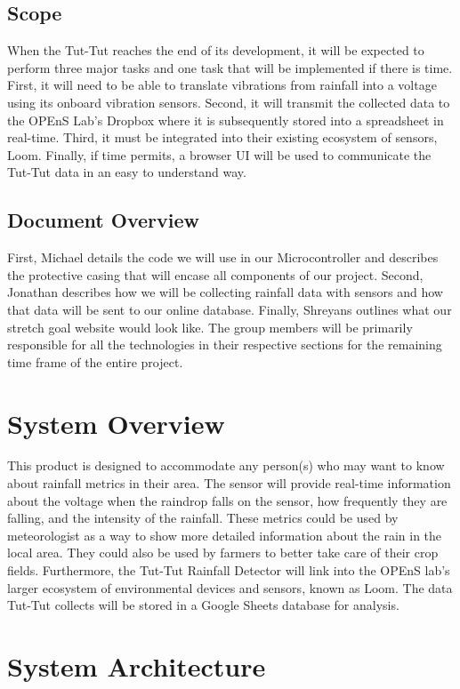 \documentclass[letterpaper,10pt,draftclsnofoot,onecolumn]{article}
\begin{document}
\subsection{Scope}
When the Tut-Tut reaches the end of its development, it will be expected to perform three major tasks and one task that will be implemented if there is time. First, it will need to be able to translate vibrations from rainfall into a voltage using its onboard vibration sensors. Second, it will transmit the collected data to the OPEnS Lab's Dropbox where it is subsequently stored into a spreadsheet in real-time. Third, it must be integrated into their existing ecosystem of sensors, Loom. Finally, if time permits, a browser UI will be used to communicate the Tut-Tut data in an easy to understand way.

\subsection{Document Overview}
First, Michael details the code we will use in our Microcontroller and describes the protective casing that will encase all components of our project. Second, Jonathan describes how we will be collecting rainfall data with sensors and how that data will be sent to our online database. Finally, Shreyans outlines what our stretch goal website would look like. The group members will be primarily responsible for all the technologies in their respective sections for the remaining time frame of the entire project.

\section{System Overview}
This product is designed to accommodate any person(s) who may want to know about rainfall metrics in their area. The sensor will provide real-time information about the voltage when the raindrop falls on the sensor, how frequently they are falling, and the intensity of the rainfall. These metrics could be used by meteorologist as a way to show more detailed information about the rain in the local area. They could also be used by farmers to better take care of their crop fields. Furthermore, the Tut-Tut Rainfall Detector will link into the OPEnS lab's larger ecosystem of environmental devices and sensors, known as Loom. The data Tut-Tut collects will be stored in a Google Sheets database for analysis.

\section{System Architecture}
\end{document}
